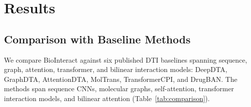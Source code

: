 \documentclass[fleqn,10pt]{wlscirep}
\begin{document}
\section{Results}
\label{sec:results}

\subsection{Comparison with Baseline Methods}

We compare BioInteract against six published DTI baselines spanning
sequence, graph, attention, transformer, and bilinear interaction models:
DeepDTA,\cite{ozturk2018deepdta} GraphDTA,\cite{nguyen2021graphdta}
AttentionDTA,\cite{zhao2022attentiondta} MolTrans,\cite{huang2021moltrans}
TransformerCPI,\cite{chen2020transformercpi} and DrugBAN.\cite{bai2023drugban}
The methods span sequence CNNs, molecular graphs, self-attention,
transformer interaction models, and bilinear attention (Table~\ref{tab:comparison}).

\begin{table}[htbp]
\centering
\caption{Comparison of BioInteract with baseline methods on the Davis dataset
  under three identifier-based splitting protocols (binary classification,
  $K_d < \SI{30}{nM}$). Best value in each column is in \textbf{bold}.}
\label{tab:comparison}
\end{table}
\end{document}
